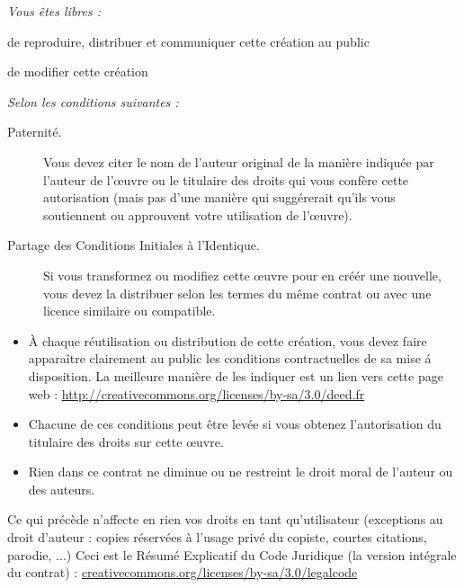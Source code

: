 \documentclass[a4paper,10pt,twoside]{book}
\begin{document}
\begin{footnotesize}
\emph{Vous \^etes libres :}
\begin{description}
  \item de reproduire, distribuer et communiquer cette cr\'eation au public
  \item de modifier cette cr\'eation
\end{description}
\emph{Selon les conditions suivantes :}
\begin{description}
  \item[Paternit\'e.] Vous devez citer le nom de l'auteur original de la mani\`ere indiqu\'ee par l'auteur de l'\oe{}uvre ou le titulaire des droits qui vous conf\`ere cette autorisation (mais pas d'une mani\`ere qui sugg\'ererait qu'ils vous soutiennent ou approuvent votre utilisation de l'\oe{}uvre).
  \item[Partage des Conditions Initiales \`a l'Identique.] Si vous transformez ou modifiez cette \oe{}uvre pour en cr\'e\'er une nouvelle, vous devez la distribuer selon les termes du m\^eme contrat ou avec une licence similaire ou compatible.
\end{description}
\begin{itemize}
  \item \`A chaque r\'eutilisation ou distribution de cette cr\'eation, vous devez faire appara\^itre clairement au public les conditions contractuelles de sa mise \'a disposition. La meilleure mani\`ere de les indiquer est un lien vers cette page web :
  \url{http://creativecommons.org/licenses/by-sa/3.0/deed.fr}
  \item Chacune de ces conditions peut \^etre lev\'ee si vous obtenez l'autorisation du titulaire des droits sur cette \oe{}uvre.
  \item Rien dans ce contrat ne diminue ou ne restreint le droit moral de l'auteur ou des auteurs.
\end{itemize}
\quad
\parbox{\textwidth-2cm-1em}{
	Ce qui pr\'ec\`ede n'affecte en rien vos droits en tant qu'utilisateur (exceptions au droit d'auteur : copies r\'eserv\'ees \`a l'usage priv\'e du copiste, courtes citations, parodie, ...)
	Ceci est le R\'esum\'e Explicatif du Code Juridique (la version int\'egrale du contrat) :	\url{creativecommons.org/licenses/by-sa/3.0/legalcode}}
\end{footnotesize}
\vfill
\tableofcontents
\sloppy %

\mainmatter
\end{document}
